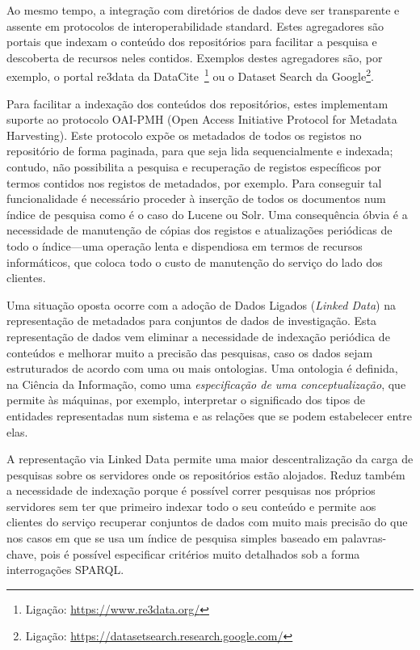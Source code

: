 \documentclass[sigconf,nonacm]{acmart}
\begin{document}
Ao mesmo tempo, a integração com diretórios de dados deve ser transparente e assente em protocolos de interoperabilidade standard. Estes agregadores são portais que indexam o conteúdo dos repositórios para facilitar a pesquisa e descoberta de recursos neles contidos. Exemplos destes agregadores são, por exemplo, o portal re3data da DataCite~\footnote{Ligação: \url{https://www.re3data.org/}} ou o Dataset Search da Google\footnote{Ligação: \url{https://datasetsearch.research.google.com/}}.

Para facilitar a indexação dos conteúdos dos repositórios, estes implementam suporte ao protocolo OAI-PMH (Open Access Initiative Protocol for Metadata Harvesting). Este protocolo expõe os metadados de todos os registos no repositório de forma paginada, para que seja lida sequencialmente e indexada; contudo, não possibilita a pesquisa e recuperação de registos específicos por termos contidos nos registos de metadados, por exemplo. Para conseguir tal funcionalidade é necessário proceder à inserção de todos os documentos num índice de pesquisa como é o caso do Lucene ou Solr. Uma consequência óbvia é a necessidade de manutenção de cópias dos registos e atualizações periódicas de todo o índice---uma operação lenta e dispendiosa em termos de recursos informáticos, que coloca todo o custo de manutenção do serviço do lado dos clientes.

Uma situação oposta ocorre com a adoção de Dados Ligados (\textit{Linked Data}) na representação de metadados para conjuntos de dados de investigação. Esta representação de dados vem eliminar a necessidade de indexação periódica de conteúdos e melhorar muito a precisão das pesquisas, caso os dados sejam estruturados de acordo com uma ou mais ontologias. Uma ontologia é definida, na Ciência da Informação, como uma \textit{especificação de uma conceptualização}\cite{gruber1995toward}, que permite às máquinas, por exemplo, interpretar o significado dos tipos de entidades representadas num sistema e as relações que se podem estabelecer entre elas.

A representação via Linked Data permite uma maior descentralização da carga de pesquisas sobre os servidores onde os repositórios estão alojados. Reduz também a necessidade de indexação porque é possível correr pesquisas nos próprios servidores sem ter que primeiro indexar todo o seu conteúdo e permite aos clientes do serviço recuperar conjuntos de dados com muito mais precisão do que nos casos em que se usa um índice de pesquisa simples baseado em palavras-chave, pois é possível especificar critérios muito detalhados sob a forma interrogações SPARQL.
\end{document}
